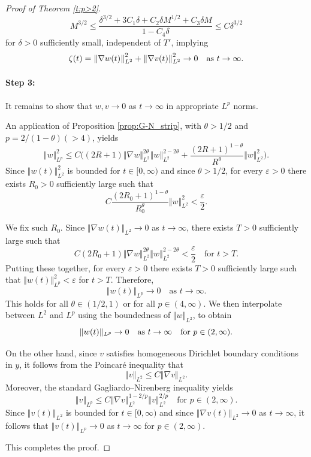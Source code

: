\documentclass[final,11pt]{article}
\renewcommand{\leq}{\leqslant}
\theoremstyle{definition} %
\newcommand{\lv}{\left\Vert}
\newcommand{\rv}{\right\Vert}
\newcommand{\eps}{\varepsilon}
\theoremstyle{plain}
\theoremstyle{definition} %
\theoremstyle{remark}
\begin{document}
\begin{proof}[Proof of Theorem \ref{t:p>2}]
\[
M^{3/2} \leq \frac{\delta^{3/2} + 3 C_1\delta + C_2\delta M^{1/2} + C_3\delta M}{1 -  {C_4}\delta} \leq C\delta^{3/2}
\]
for $\delta>0$ sufficiently small, independent of $T'$, implying 
\[
\zeta(t)= \lv \nabla w(t)\rv_{L^2}^2 + \lv \nabla v(t) \rv_{L^2}^2 \to 0 \quad\text{as $ t \to \infty$}.
\]

\paragraph{Step 3:}It remains to show that $w,v\to 0$ as $t\to\infty$ in appropriate $L^p$ norms.

An application of Proposition \ref{prop:G-N_strip}, with $\theta > 1/2$ and $p = 2/(1-\theta)( > 4)$, yields
\[
\Vert w \Vert_{L^p}^2 \leq  C\Big((2R+1)\Vert \nabla  w \Vert_{L^2}^{2\theta}\lv  w\rv_{L^2}^{2-2\theta} + \frac{(2R+1)^{1-\theta}}{R^{\theta}} \Vert  w \Vert_{L^2}^2\Big).
\]
Since $\Vert  w(t) \Vert_{L^2}^2$ is bounded for $t\in[0,\infty)$ and since $\theta > 1/2$, for every $\eps > 0$ there exists $R_0 > 0$ sufficiently large such that 
\[
C\frac{(2R_0+1)^{1-\theta}}{R_0^\theta} \Vert  w \Vert_{L^2}^2 < \frac{\eps}{2} .
\]

We fix such $R_0$. Since $\Vert \nabla  w(t) \Vert_{L^2} \to 0$ as $t\to \infty$, there exists $T>0$ sufficiently large such that 
\[C(2R_0+1)\Vert \nabla  w \Vert_{L^2}^{2\theta}\lv  w\rv_{L^2}^{2-2\theta} < \frac{\eps}{2} \quad \text{for $t > T$} .
\] 
Putting these together, for every $\eps > 0$ there exists $T > 0$ sufficiently large such that $\Vert w(t) \Vert_{L^p}^2 < \eps$ for $t > T$. Therefore,
\[
\Vert w(t) \Vert_{L^p} \to 0\quad \text{as $t \to \infty$}.
\]
This holds for all $\theta \in(1/2, 1)$ or for all $p \in (4, \infty)$. 
We then interpolate between $L^2$ and $L^p$ using the boundedness of $\Vert  w \Vert_{L^2}$, to obtain 
\[
\Vert w(t) \Vert_{L^p} \to 0\quad \text{as $t \to \infty$} \quad\text{for $ p \in(2, \infty)$}. 
\]

On the other hand, since $v$ satisfies homogeneous Dirichlet boundary conditions in $y$, it follows from the Poincar{\'e} inequality that
\[
\lv v \rv_{L^2} \leq C \lv \nabla v \rv_{L^2}.
\]
Moreover, the standard Gagliardo--Nirenberg inequality yields 
\[
\lv v \rv_{L^p} \leq C\lv \nabla v\rv_{L^2}^{1-2/p} \lv v \rv_{L^2}^{2/p} \quad \text{for $p \in (2, \infty)$}.
\]
Since $\lv v(t) \rv_{L^2}$ is bounded for $t\in[0,\infty)$ and since $\lv \nabla v(t) \rv_{L^2} \to 0$ as $t \to \infty$, it follows that $\lv v(t) \rv_{L^p} \to 0$ as $t\to\infty$ for $p \in (2, \infty)$.

This completes the proof.
\end{proof}
\end{document}
